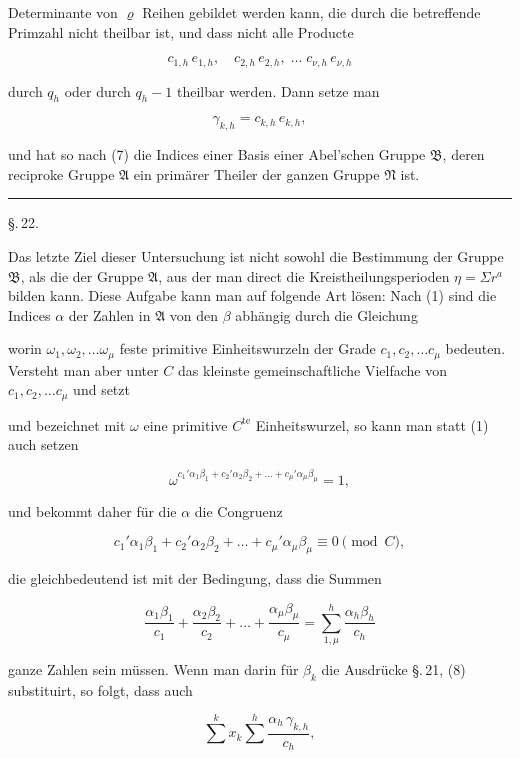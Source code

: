 
Determinante von $\varrho$ Reihen gebildet werden kann, die durch die
betreffende Primzahl nicht theilbar ist, und dass nicht alle Producte

\[
c_{1,h}\,e_{1,h}, \quad c_{2,h}\,e_{2,h}, \; \dots \; c_{\nu,h}\,e_{\nu,h}
\]

durch $q_h$ oder durch $q_h - 1$ theilbar werden. Dann setze man

\[
\gamma_{k,h} = c_{k,h}\,e_{k,h},
\]

und hat so nach (7) die Indices einer Basis einer Abel'schen Gruppe
$\mathfrak{B}$, deren reciproke Gruppe $\mathfrak{A}$ ein prim\"arer
Theiler der ganzen Gruppe $\mathfrak{N}$ ist.

\noindent\rule{4cm}{0.4pt}

\begin{center}
\S.\,22.

\end{center}

Das letzte Ziel dieser Untersuchung ist nicht sowohl die Bestimmung der
Gruppe $\mathfrak{B}$, als die der Gruppe $\mathfrak{A}$, aus der man
direct die Kreistheilungsperioden $\eta = \Sigma r^a$ bilden kann. Diese
Aufgabe kann man auf folgende Art l\"osen: Nach (1) sind die Indices
$\alpha$ der Zahlen in $\mathfrak{A}$ von den $\beta$ abh\"angig durch
die Gleichung


worin $\omega_1, \omega_2, \dots \omega_\mu$ feste primitive
Einheitswurzeln der Grade $c_1, c_2, \dots c_\mu$ bedeuten. Versteht man
aber unter $C$ das kleinste gemeinschaftliche Vielfache von $c_1, c_2,
\dots c_\mu$ und setzt


und bezeichnet mit $\omega$ eine primitive $C^{\mathrm{te}}$
Einheitswurzel, so kann man statt (1) auch setzen

\[
\omega^{c_1'\alpha_1\beta_1 + c_2'\alpha_2\beta_2 + \dots +
c_\mu'\alpha_\mu\beta_\mu} = 1,
\]

und bekommt daher f\"ur die $\alpha$ die Congruenz

\[
c_1'\alpha_1\beta_1 + c_2'\alpha_2\beta_2 + \dots +
c_\mu'\alpha_\mu\beta_\mu \equiv 0 \pmod{C},
\]

die gleichbedeutend ist mit der Bedingung, dass die Summen

\[
\frac{\alpha_1\beta_1}{c_1} + \frac{\alpha_2\beta_2}{c_2} + \dots +
\frac{\alpha_\mu\beta_\mu}{c_\mu} = \sum_{1,\mu}^{h} \frac{\alpha_h
\beta_h}{c_h}
\]

ganze Zahlen sein m\"ussen. Wenn man darin f\"ur $\beta_k$ die
Ausdr\"ucke \S.\,21, (8) substituirt, so folgt, dass auch

\[
\sum^{k} x_k \sum^{h} \frac{\alpha_h\,\gamma_{k,h}}{c_h},
\]
